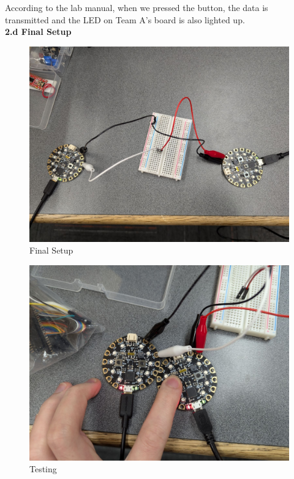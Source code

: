 \documentclass{report}
\begin{document}
    According to the lab manual, when we pressed the button, the data is transmitted and the LED on Team A's board is also lighted up. \\[1em]
{\Large \textbf{2.d Final Setup}}\\
\begin{minipage}{0.49\textwidth}
    \begin{figure}[H]
        \centering
        \includegraphics[width=\textwidth]{setup.jpg}
        \caption{Final Setup}
    \end{figure}
\end{minipage}
\hfill
\begin{minipage}{0.49\textwidth}
    \begin{figure}[H]
        \centering
        \includegraphics[width=\textwidth]{test.jpg}
        \caption{Testing}
    \end{figure}
\end{minipage}\\[0.5em]
\end{document}
